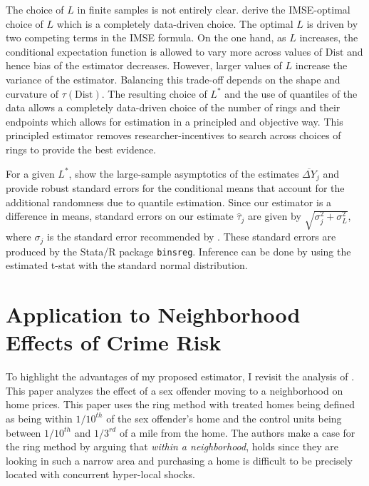 \documentclass[10pt]{article}
\newcommand{\dist}{\text{Dist}}
\begin{document}
The choice of $L$ in finite samples is not entirely clear. \citet{Cattaneo_Crump_Farrell_Feng_2019} derive the IMSE-optimal choice of $L$ which is a completely data-driven choice. The optimal $L$ is driven by two competing terms in the IMSE formula. On the one hand, as $L$ increases, the conditional expectation function is allowed to vary more across values of $\dist$ and hence bias of the estimator decreases. However, larger values of $L$ increase the variance of the estimator. Balancing this trade-off depends on the shape and curvature of $\tau(\dist)$. The resulting choice of $L^*$ and the use of quantiles of the data allows a completely data-driven choice of the number of rings and their endpoints which allows for estimation in a principled and objective way. This principled estimator removes researcher-incentives to search across choices of rings to provide the best evidence. 

For a given $L^*$, \citet{Cattaneo_Crump_Farrell_Feng_2019} show the large-sample asymptotics of the estimates $\overline{\Delta Y}_j$ and provide robust standard errors for the conditional means that account for the additional randomness due to quantile estimation. Since our estimator is a difference in means, standard errors on our estimate $\hat{\tau}_j$ are given by $\sqrt{\sigma^2_j + \sigma^2_L}$, where $\sigma_j$ is the standard error recommended by \citet{Cattaneo_Crump_Farrell_Feng_2019}. These standard errors are produced by the Stata/R package \texttt{binsreg}. Inference can be done by using the estimated t-stat with the standard normal distribution.




\section{Application to Neighborhood Effects of Crime Risk}

To highlight the advantages of my proposed estimator, I revisit the analysis of \citet{Linden_Rockoff_2008}. This paper analyzes the effect of a sex offender moving to a neighborhood on home prices. This paper uses the ring method with treated homes being defined as being within $1/10^{th}$ of the sex offender's home and the control units being between $1/10^{th}$ and $1/3^{rd}$ of a mile from the home. The authors make a case for the ring method by arguing that \emph{within a neighborhood},  holds since they are looking in such a narrow area and purchasing a home is difficult to be precisely located with concurrent hyper-local shocks. 
\end{document}
